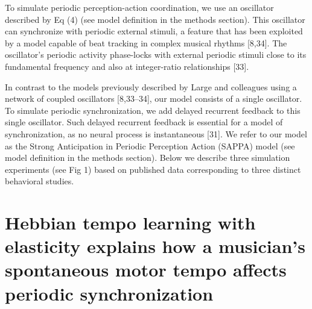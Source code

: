 \documentclass{report}
\begin{document}
To simulate periodic perception-action coordination, we use an oscillator described by Eq (4) (see model definition in the methods section). This oscillator can synchronize with periodic external stimuli, a feature that has been exploited by a model capable of beat tracking in complex musical rhythms [8,34]. The oscillator’s periodic activity phase-locks with external periodic stimuli close to its fundamental frequency and also at integer-ratio relationships [33].

In contrast to the models previously described by Large and colleagues using a network of coupled oscillators [8,33–34], our model consists of a single oscillator. To simulate periodic synchronization, we add delayed recurrent feedback to this single oscillator. Such delayed recurrent feedback is essential for a model of synchronization, as no neural process is instantaneous [31]. We refer to our model as the Strong Anticipation in Periodic Perception Action (SAPPA) model (see model definition in the methods section). Below we describe three simulation experiments (see Fig 1) based on published data corresponding to three distinct behavioral studies.

\chapter{Hebbian tempo learning with elasticity explains how a musician's spontaneous motor tempo affects periodic synchronization}
\end{document}

